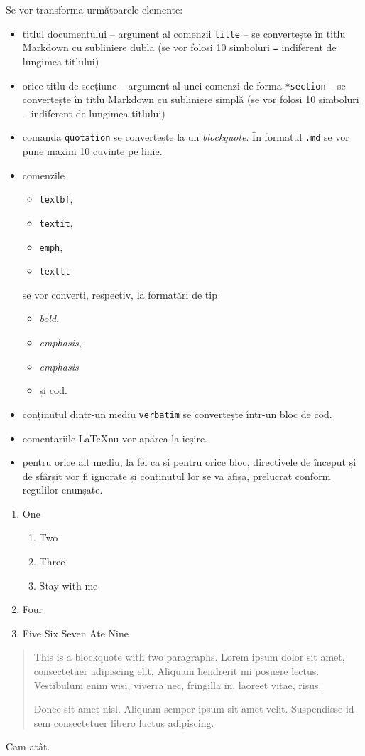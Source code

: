 \documentclass[a4paper, 12pt, twoside]{article}
\begin{document}
Se vor transforma următoarele elemente: 												
\begin{itemize}
	\item titlul documentului -- argument al comenzii \texttt{title} -- se convertește în titlu Markdown cu subliniere dublă (se vor folosi 10 simboluri \texttt{=} indiferent de lungimea titlului)
	\item orice titlu de secțiune -- argument al unei comenzi de forma \texttt{*section} -- se convertește în titlu Markdown cu subliniere simplă (se vor folosi 10 simboluri \texttt{-} indiferent de lungimea titlului)
	\item comanda \texttt{quotation} se convertește la un \emph{blockquote}. În formatul \texttt{.md} se vor pune maxim 10 cuvinte pe linie.
	\item comenzile \begin{itemize}
		\item \texttt{textbf},
		\item \texttt{textit},
		\item \texttt{emph},
		\item \texttt{texttt}
		\end{itemize}
		se vor converti, respectiv, la formatări de tip 
		\begin{itemize}
		\item \emph{bold}, 
		\item \emph{emphasis}, 
		\item \emph{emphasis} 
		\item și cod.
		\end{itemize}
	\item conținutul dintr-un mediu \texttt{verbatim} se convertește într-un bloc de cod. %
	\item comentariile \LaTeX nu vor apărea la ieșire.
	\item pentru orice alt mediu, la fel ca și pentru orice bloc, directivele de început și de sfârșit vor fi ignorate și conținutul lor se va afișa, prelucrat conform regulilor enunșate.	\end{itemize}

\begin{enumerate}
	\item One
		\begin{enumerate}
		\item Two
		\item Three
		\item Stay with me
	\end{enumerate}
	\item Four
	\item Five Six Seven Ate Nine
\end{enumerate}

\begin{quotation}
This is a blockquote with two paragraphs. Lorem ipsum dolor sit amet, consectetuer adipiscing elit. Aliquam hendrerit mi posuere lectus. Vestibulum enim wisi, viverra nec, fringilla in, laoreet vitae, risus.

Donec sit amet nisl. Aliquam semper ipsum sit amet velit. Suspendisse id sem consectetuer libero luctus adipiscing.
\end{quotation}

Cam atât.
\end{document}
